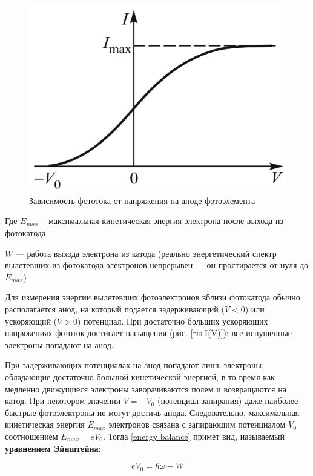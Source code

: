 \documentclass[a4paper,12pt]{article}
\begin{document}
\begin{figure}[h!]
\centering
\includegraphics[scale=0.3]{I(V)}
\caption{Зависимость фототока от напряжения на аноде фотоэлемента}
\label{fig:iv_theory}
\end{figure}
	
Где $ E_{max} $ --  максимальная кинетическая энергия электрона после выхода из фотокатода

$ W $ --- работа выхода электрона из катода (реально энергетический спектр вылетевших из фотокатода электронов непрерывен --- он простирается от нуля до $ E_{max} $)
	
Для измерения энергии вылетевших фотоэлектронов вблизи фотокатода обычно располагается анод, на который подается задерживающий ($ V < 0 $) или ускоряющий ($ V > 0 $) потенциал. При достаточно больших ускоряющих напряжениях фототок достигает насыщения (рис. \ref{ris I(V)}): все испущенные электроны попадают на анод.
	
При задерживающих потенциалах на анод попадают лишь электроны,
обладающие достаточно большой кинетической энергией, в то время как медленно движущиеся электроны заворачиваются полем и возвращаются на катод. При некотором значении $ V = -V_0 $ (потенциал запирания) даже наиболее быстрые фотоэлектроны не могут достичь анода.
	Следовательно, максимальная кинетическая энергия $ E_{max}$ электронов связана с запирающим потенциалом $ V_0 $ соотношением $ E_{max} = eV_0 $. Тогда \eqref{energy balance} примет вид, называемый \textbf{уравнением Эйнштейна}:
	
\begin{equation}
eV_0 = \hbar\omega - W 
\label{e:einst}
\end{equation}
	
\end{document}
